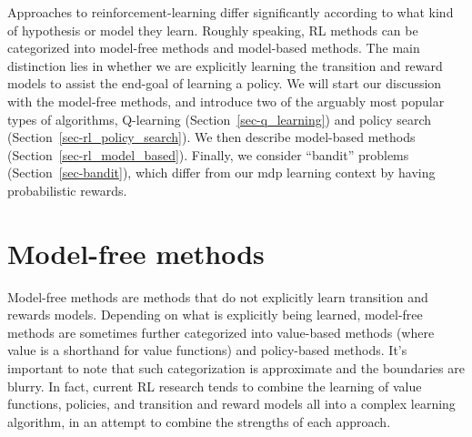 Approaches to reinforcement-learning differ significantly according to
what kind of hypothesis or model they learn. Roughly speaking, RL
methods can be categorized into model-free methods and model-based
methods. The main distinction lies in whether we are explicitly
learning the transition and reward models to assist the end-goal of
learning a policy.  We will start our discussion with the model-free
methods, and introduce two of the arguably most popular types of algorithms,
Q-learning (Section~\ref{sec-q_learning}) and policy search
(Section~\ref{sec-rl_policy_search}).  We then describe
model-based methods (Section~\ref{sec-rl_model_based}).  Finally, we
consider ``bandit'' problems (Section~\ref{sec-bandit}), which differ
from our {\sc mdp} learning context by having probabilistic rewards.




\section{Model-free methods}

Model-free methods are methods that do not explicitly learn transition
and rewards models. Depending on what is explicitly being learned,
model-free methods are sometimes further categorized into value-based
methods (where value is a shorthand for value functions) and
policy-based methods. It's important to note that such
categorization is approximate and the boundaries are blurry. In fact,
current RL research tends to combine the learning of value functions,
policies, and transition and reward models all into a complex learning
algorithm, in an attempt to combine the strengths of each approach.




